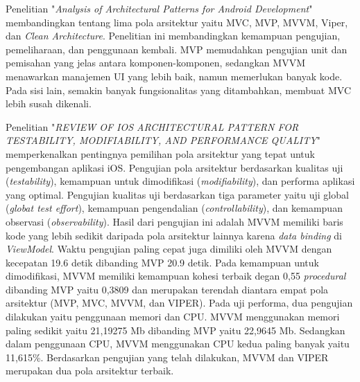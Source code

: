 \documentclass[conference]{IEEEtran}
\begin{document}
	Penelitian "\textit{Analysis of Architectural Patterns for Android Development}" \cite{Akh2021} membandingkan tentang lima pola arsitektur yaitu MVC, MVP, MVVM, Viper, dan \textit{Clean Architecture}. Penelitian ini membandingkan kemampuan pengujian, pemeliharaan, dan penggunaan kembali. MVP memudahkan pengujian unit dan pemisahan yang jelas antara komponen-komponen, sedangkan MVVM menawarkan manajemen UI yang lebih baik, namun memerlukan banyak kode. Pada sisi lain, semakin banyak fungsionalitas yang ditambahkan, membuat MVC lebih susah dikenali.
 
    Penelitian "\textit{REVIEW OF IOS ARCHITECTURAL PATTERN FOR
    TESTABILITY, MODIFIABILITY, AND PERFORMANCE QUALITY}" \cite{fz2019} memperkenalkan pentingnya pemilihan pola arsitektur yang tepat untuk pengembangan aplikasi iOS. Pengujian pola arsitektur berdasarkan kualitas uji (\textit{testability}), kemampuan untuk dimodifikasi (\textit{modifiability}), dan performa aplikasi yang optimal. Pengujian kualitas uji berdasarkan tiga parameter yaitu uji global (\textit{globat test effort}), kemampuan pengendalian (\textit{controllability}), dan kemampuan observasi (\textit{observability}). Hasil dari pengujian ini adalah MVVM memiliki baris kode yang lebih sedikit daripada pola arsitektur lainnya karena \textit{data binding} di \textit{ViewModel}. Waktu pengujian paling cepat juga dimiliki oleh MVVM dengan kecepatan 19.6 detik dibanding MVP 20.9 detik. Pada kemampuan untuk dimodifikasi, MVVM memiliki kemampuan kohesi terbaik degan 0,55 \textit{procedural} dibanding MVP yaitu 0,3809 dan merupakan terendah diantara empat pola arsitektur (MVP, MVC, MVVM, dan VIPER). Pada uji performa, dua pengujian dilakukan yaitu penggunaan memori dan CPU. MVVM menggunakan memori paling sedikit yaitu 21,19275 Mb dibanding MVP yaitu 22,9645 Mb. Sedangkan dalam penggunaan CPU, MVVM menggunakan CPU kedua paling banyak yaitu 11,615\%. Berdasarkan pengujian yang telah dilakukan, MVVM dan VIPER merupakan dua pola arsitektur terbaik.
    
\end{document}
